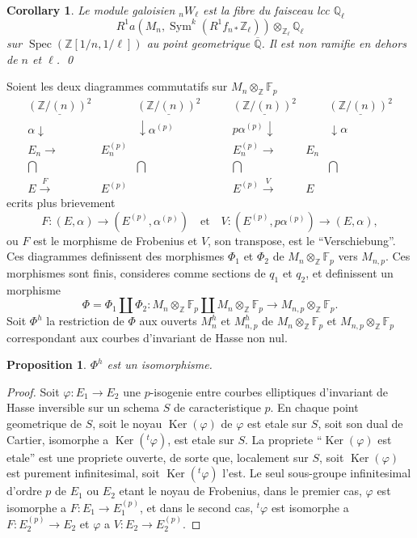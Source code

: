 \documentclass[11pt,reqno]{amsart}
\theoremstyle{plain}
\newtheorem{proposition}[theorem]{Proposition}
\newtheorem{corollary}[theorem]{Corollary}
\theoremstyle{remark}
\DeclareMathOperator{\Sym}{Sym}
\DeclareMathOperator{\Spec}{Spec}
\DeclareMathOperator{\Ker}{Ker}
\newcommand{\Z}{\mathbb{Z}}
\newcommand{\Q}{\mathbb{Q}}
\newcommand{\F}{\mathbb{F}}
\numberwithin{equation}{section}
\begin{document}
\begin{corollary}\label{cor:4.2}
Le module galoisien ${}_nW_\ell$ est la fibre du faisceau lcc $\Q_\ell$
\[
R^1 a(M_n, \Sym^k(R^1f_{n*}\Z_\ell)) \otimes_{\Z_\ell} \Q_\ell
\]
sur $\Spec(\Z[1/n, 1/\ell])$ au point geometrique $\overline{\Q}$. Il est non ramifie en dehors de $n$ et $\ell$. \qed
\end{corollary}

Soient les deux diagrammes commutatifs sur $M_n \otimes_\Z \F_p$
\[
\begin{array}{ccc}
\underline{(\Z/(n))^2} & & \underline{(\Z/(n))^2} \\
\alpha \downarrow & & \downarrow \alpha^{(p)} \\
E_n \longrightarrow & E_n^{(p)} & \\
\bigcap & & \bigcap \\
E \xrightarrow{\;F\;} & E^{(p)}
\end{array}
\qquad
\begin{array}{ccc}
\underline{(\Z/(n))^2} & & \underline{(\Z/(n))^2} \\
p\alpha^{(p)} \downarrow & & \downarrow \alpha \\
E_n^{(p)} \longrightarrow & E_n & \\
\bigcap & & \bigcap \\
E^{(p)} \xrightarrow{\;V\;} & E
\end{array}
\]
ecrits plus brievement
\[
F: (E, \alpha) \to (E^{(p)}, \alpha^{(p)}) \quad \text{et} \quad V: (E^{(p)}, p\alpha^{(p)}) \to (E, \alpha),
\]
ou $F$ est le morphisme de Frobenius et $V$, son transpose, est le ``Verschiebung''. Ces diagrammes definissent des morphismes $\Phi_1$ et $\Phi_2$ de $M_n \otimes_\Z \F_p$ vers $M_{n,p}$. Ces morphismes sont finis, consideres comme sections de $q_1$ et $q_2$, et definissent un morphisme
\[
\Phi = \Phi_1 \amalg \Phi_2: M_n \otimes_\Z \F_p \amalg M_n \otimes_\Z \F_p \to M_{n,p} \otimes_\Z \F_p.
\]
Soit $\Phi^h$ la restriction de $\Phi$ aux ouverts $M_n^h$ et $M_{n,p}^h$ de $M_n \otimes_\Z \F_p$ et $M_{n,p} \otimes_\Z \F_p$ correspondant aux courbes d'invariant de Hasse non nul.

\begin{proposition}\label{prop:4.3}
$\Phi^h$ est un isomorphisme.
\end{proposition}

\begin{proof}
Soit $\varphi: E_1 \to E_2$ une $p$-isogenie entre courbes elliptiques d'invariant de Hasse inversible sur un schema $S$ de caracteristique $p$. En chaque point geometrique de $S$, soit le noyau $\Ker(\varphi)$ de $\varphi$ est etale sur $S$, soit son dual de Cartier, isomorphe a $\Ker(^t\!\varphi)$, est etale sur $S$. La propriete ``$\Ker(\varphi)$ est etale'' est une propriete ouverte, de sorte que, localement sur $S$, soit $\Ker(\varphi)$ est purement infinitesimal, soit $\Ker(^t\!\varphi)$ l'est. Le seul sous-groupe infinitesimal d'ordre $p$ de $E_1$ ou $E_2$ etant le noyau de Frobenius, dans le premier cas, $\varphi$ est isomorphe a $F: E_1 \to E_1^{(p)}$, et dans le second cas, $^t\!\varphi$ est isomorphe a $F: E_2^{(p)} \to E_2$ et $\varphi$ a $V: E_2 \to E_2^{(p)}$.
\end{proof}
\end{document}

